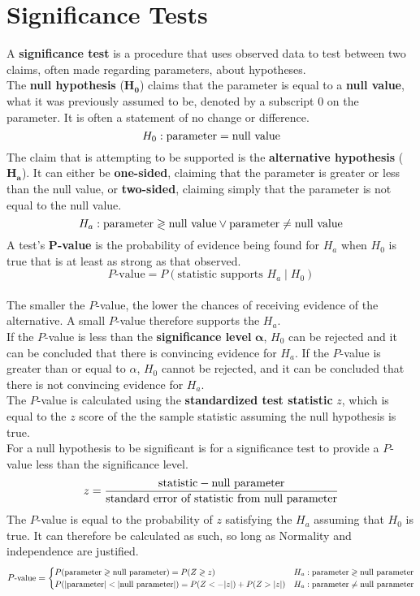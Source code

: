 \documentclass[../AP_Statistics.tex]{subfiles}
\begin{document}
	\chapter{Significance Tests}
		A \textbf{significance test} is a procedure that uses observed data to test between two claims, often made regarding parameters, about hypotheses. \\
		The \textbf{null hypothesis} ($\pmb{H_0}$) claims that the parameter is equal to a \textbf{null value}, what it was previously assumed to be, denoted by a subscript $0$ on the parameter. It is often a statement of no change or difference.
		\[H_0:\rm{parameter} = \text{null value}\]
		The claim that is attempting to be supported is the \textbf{alternative hypothesis} ($\pmb{H_a}$). It can either be \textbf{one-sided}, claiming that the parameter is greater or less than the null value, or \textbf{two-sided}, claiming simply that the parameter is not equal to the null value.
		\[H_a:\rm{parameter} \gtrless \text{null value} \lor \rm{parameter} \ne \text{null value}\]
		A test's $\pmb{P}$\textbf{-value} is the probability of evidence being found for $H_a$ when $H_0$ is true that is at least as strong as that observed.
		\[P\text{-value} = P(\text{statistic supports } H_a \mid H_0)\] \\
		The smaller the $P$-value, the lower the chances of receiving evidence of the alternative. A small $P$-value therefore supports the $H_a$. \\
		If the $P$-value is less than the \textbf{significance level} $\pmb{\alpha}$, $H_0$ can be rejected and it can be concluded that there is convincing evidence for $H_a$. If the $P$-value is greater than or equal to $\alpha$, $H_0$ cannot be rejected, and it can be concluded that there is not convincing evidence for $H_a$. \\
		The $P$-value is calculated using the \textbf{standardized test statistic} $z$, which is equal to the $z$ score of the the sample statistic assuming the null hypothesis is true. \\
		For a null hypothesis to be significant is for a significance test to provide a $P$-value less than the significance level.
		\[z = \frac{\text{statistic} - \text{null parameter}}{\text{standard error of statistic from null parameter}}\]
		The $P$-value is equal to the probability of $z$ satisfying the $H_a$ assuming that $H_0$ is true. It can therefore be calculated as such, so long as Normality and independence are justified.
		\[\small
			P\text{-value} = \begin{cases}
				P(\text{parameter} \gtrless \text{null parameter}) = P(Z \gtrless z) & H_a:\text{parameter} \gtrless \text{null parameter} \\
				P(|\text{parameter}| < |\text{null parameter}|) = P(Z < -|z|) + P(Z > |z|) & H_a:\text{parameter} \ne \text{null parameter}
			\end{cases}
		\]
\end{document}
